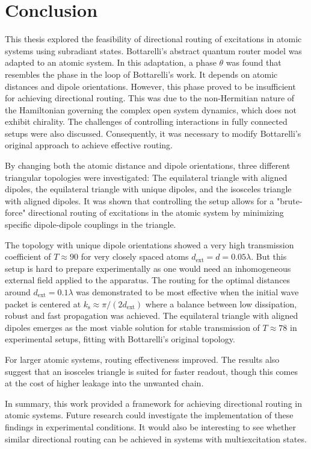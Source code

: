 \chapter{Conclusion}
\label{Chapter5}
This thesis explored the feasibility of directional routing of excitations in atomic systems using subradiant states.
Bottarelli's abstract quantum router model was adapted to an atomic system.
In this adaptation, a phase $ \theta $ was found that resembles the phase in the loop of Bottarelli's work.
It depends on atomic distances and dipole orientations.
However, this phase proved to be insufficient for achieving directional routing.
This was due to the non-Hermitian nature of the Hamiltonian governing the complex open system dynamics, which does not exhibit chirality.
The challenges of controlling interactions in fully connected setups were also discussed.
Consequently, it was necessary to modify Bottarelli's original approach to achieve effective routing.

\noindent
By changing both the atomic distance and dipole orientations, three different triangular topologies were investigated:
The equilateral triangle with aligned dipoles,
the equilateral triangle with unique dipoles, and the isosceles triangle with aligned dipoles.
It was shown that controlling the setup allows for a "brute-force"
directional routing of excitations in the atomic system by minimizing specific dipole-dipole couplings in the triangle.

\noindent
The topology with unique dipole orientations showed a very high transmission coefficient of $ T \approx 90 $ for very closely spaced atoms $d_\text{ext} = d = 0.05 \lambda$.
But this setup is hard to prepare experimentally as one would need an inhomogeneous external field applied to the apparatus.
The routing for the optimal distances around $ d_\text{ext} = 0.1 \lambda $ was demonstrated to be most effective
when the initial wave packet is centered at $k_\text{s} \approx \pi / (2 d_{\text{ext}})$ where a balance between low dissipation,
robust and fast propagation was achieved.
The equilateral triangle with aligned dipoles emerges as the most viable solution for stable transmission of $ T \approx 78 $ in experimental setups,
fitting with Bottarelli's original topology.

\noindent
For larger atomic systems, routing effectiveness improved.
The results also suggest that an isosceles triangle is suited for faster readout,
though this comes at the cost of higher leakage into the unwanted chain.


\noindent
In summary, this work provided a framework for achieving directional routing in atomic systems.
Future research could investigate the implementation of these findings in experimental conditions.
It would also be interesting to see whether similar directional routing can be achieved in systems with multiexcitation states.